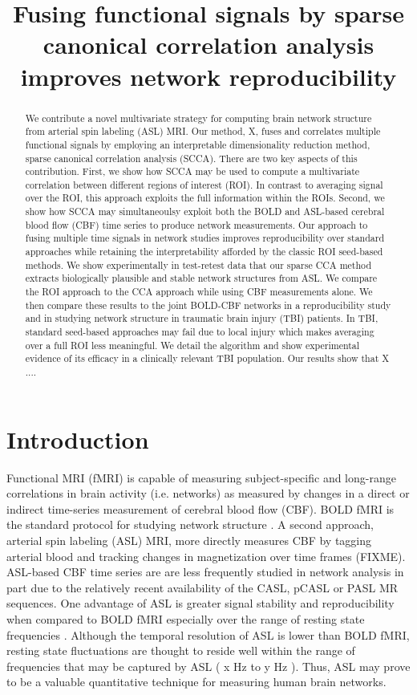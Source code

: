 \documentclass{llncs}
\title{Fusing functional signals by sparse canonical correlation analysis improves network reproducibility}
\begin{document}
\maketitle
\begin{abstract}
We contribute a novel multivariate strategy for computing brain network structure from arterial spin labeling (ASL) MRI.  Our method, X, fuses and correlates multiple functional signals by employing an interpretable dimensionality reduction method, sparse canonical correlation analysis (SCCA).  There are two key aspects of this contribution.  First, we show how SCCA may be used to compute a multivariate correlation between different regions of interest (ROI).  In contrast to averaging signal over the ROI, this approach exploits the full information within the ROIs.  Second, we show how SCCA may simultaneoulsy exploit both the BOLD and ASL-based cerebral blood flow (CBF) time series to produce network measurements.  Our approach to fusing multiple time signals in network studies improves reproducibility over standard approaches while retaining the interpretability afforded by the classic ROI seed-based methods.  We show experimentally in test-retest data that our sparse CCA method extracts biologically plausible and stable network structures from ASL.  We compare the ROI approach to the CCA approach while using CBF measurements alone.  We then compare these results to the joint BOLD-CBF networks in a reproducibility study and in studying network structure in traumatic brain injury (TBI) patients.  In TBI, standard seed-based approaches may fail due to local injury which makes averaging over a full ROI less meaningful.  We detail the algorithm and show experimental evidence of its efficacy in a clinically relevant TBI population.  Our results show that X ....  
\end{abstract}

\section*{Introduction}
Functional MRI (fMRI) is capable of measuring subject-specific and long-range correlations in brain activity (i.e. networks) as measured by changes in a direct or indirect time-series measurement of cerebral blood flow (CBF).  BOLD fMRI is the standard protocol for studying network structure \cite{}.  A second approach, arterial spin labeling (ASL) MRI, more directly measures CBF by tagging arterial blood and tracking changes in magnetization over time frames (FIXME).  ASL-based CBF time series are are less frequently studied in network analysis in part due to the relatively recent availability of the CASL, pCASL or PASL MR sequences.  One advantage of ASL is greater signal stability and reproducibility when compared to BOLD fMRI especially over the range of resting state frequencies \cite{Aguirre paper}.  Although the temporal resolution of ASL is lower than BOLD fMRI, resting state fluctuations are thought to reside well within the range of frequencies that may be captured by ASL ( x Hz to y Hz ).  Thus, ASL may prove to be a valuable quantitative technique for measuring human brain networks.
\cite{Implementation of Quantitative Perfusion Imaging Techniques for Functional Brain Mapping using Pulsed Arterial Spin Labeling}
\end{document}
